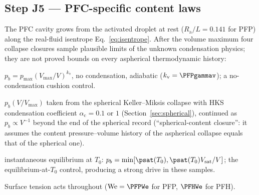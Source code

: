 \subsection{Step J5 --- PFC-specific content laws}
The PFC cavity grows from the activated droplet at rest ($R_{\mathrm a}/L=0.141$ for PFP) along the
real-fluid isentrope Eq.~\eqref{eq:isentrope}. After the volume maximum four collapse closures
sample plausible limits of the unknown condensation physics; they are not proved bounds on every
aspherical thermodynamic history:
\begin{description}[leftmargin=0.6cm,style=sameline]
\item[frozen] $p_b=p_{\max}(V_{\max}/V)^{k_{\mathrm v}}$, no condensation, adiabatic ($k_{\mathrm v}=\PFPgammav$);
a no-condensation cushion control.
\item[KM $\alpha_{\mathrm c}$] $p_b(V/V_{\max})$ taken from the spherical Keller--Miksis collapse with HKS
condensation coefficient $\alpha_{\mathrm c}=0.1$ or $1$ (Section~\ref{sec:spherical}), continued as
$p_b\propto V^{-1}$ beyond the end of the spherical record (``spherical-content closure'': it assumes the
content pressure--volume history of the aspherical collapse equals that of the spherical one).
\item[isoeq] instantaneous equilibrium at $T_0$: $p_b=\min[\psat(T_0),\psat(T_0)V_{\mathrm{sat}}/V]$; the
equilibrium-at-$T_0$ control, producing a strong drive in these samples.
\end{description}
Surface tension acts throughout ($\mathrm{We}=\PFPWe$ for PFP, $\PFHWe$ for PFH).

